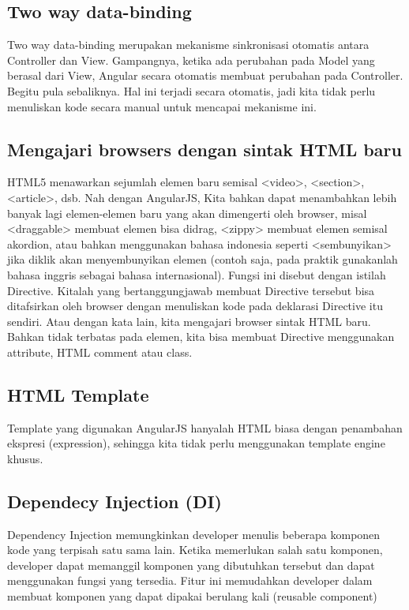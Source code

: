 \subsection{Two way data-binding}
\label{sub: twoWayDataBinding}

	Two way data-binding merupakan mekanisme sinkronisasi otomatis antara Controller dan View. Gampangnya, ketika ada perubahan pada Model yang berasal dari View, Angular secara otomatis membuat perubahan pada Controller. Begitu pula sebaliknya. Hal ini terjadi secara otomatis, jadi kita tidak perlu menuliskan kode secara manual untuk mencapai mekanisme ini.

\subsection{Mengajari browsers dengan sintak HTML baru}
\label{sub: mengajariBrowsersDenganSintakHTMLBaru}

	HTML5 menawarkan sejumlah elemen baru semisal <video>, <section>, <article>, dsb. Nah dengan AngularJS, Kita bahkan dapat menambahkan lebih banyak lagi elemen-elemen baru yang akan dimengerti oleh browser, misal <draggable> membuat elemen bisa didrag, <zippy> membuat elemen semisal akordion, atau bahkan menggunakan bahasa indonesia seperti <sembunyikan> jika diklik akan menyembunyikan elemen (contoh saja, pada praktik gunakanlah bahasa inggris sebagai bahasa internasional). Fungsi ini disebut dengan istilah Directive. Kitalah yang bertanggungjawab membuat Directive tersebut bisa ditafsirkan oleh browser dengan menuliskan kode pada deklarasi Directive itu sendiri. Atau dengan kata lain, kita mengajari browser sintak HTML baru. Bahkan tidak terbatas pada elemen, kita bisa membuat Directive menggunakan attribute, HTML comment atau class.

\subsection{HTML Template}
\label{sub: HTMLTemplate}

	Template yang digunakan AngularJS hanyalah HTML biasa dengan penambahan ekspresi (expression), sehingga kita tidak perlu menggunakan template engine khusus.

\subsection{Dependecy Injection (DI)}
\label{sub: DI}

	Dependency Injection memungkinkan developer menulis beberapa komponen kode yang terpisah satu sama lain. Ketika memerlukan salah satu komponen, developer dapat memanggil komponen yang dibutuhkan tersebut dan dapat menggunakan fungsi yang tersedia. Fitur ini memudahkan developer dalam membuat komponen yang dapat dipakai berulang kali (reusable component)

